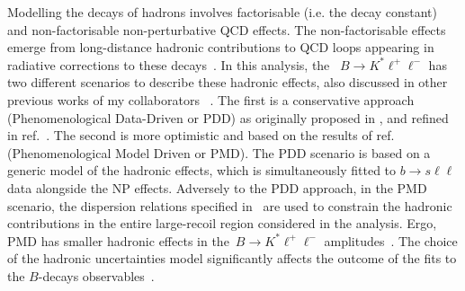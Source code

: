 \par Modelling the decays of hadrons involves factorisable (i.e. the decay constant) and non-factorisable non-perturbative QCD effects. The non-factorisable effects emerge from long-distance hadronic contributions to QCD loops appearing in radiative corrections to these decays~\cite{Khodjamirian:2010vf,Jager:2014rwa,Lyon:2014hpa}. In this analysis, the ~$B\to K^*\ell^+\ell^-$ has two different scenarios to describe these hadronic effects, also discussed in other previous works of my collaborators ~\cite{Ciuchini:2016weo,Ciuchini:2017mik,Ciuchini:2017gva,Ciuchini:2018xll,Ciuchini:2018anp, Ciuchini:2019usw}. The first is a conservative approach (Phenomenological Data-Driven or PDD) as originally proposed in \cite{Ciuchini:2015qxb}, and refined in ref.~\cite{Ciuchini:2018anp}. The second is  more optimistic and  based on the results of ref.~\cite{Khodjamirian:2010vf} (Phenomenological Model Driven or PMD). The PDD scenario is based on a generic model of the hadronic effects, which is simultaneously fitted to $b \to s \ell \ell$ data alongside the NP effects. Adversely to the PDD approach, in the PMD scenario, the dispersion relations specified in~\cite{Khodjamirian:2010vf} are used to constrain the hadronic contributions in the entire large-recoil region considered in the analysis. Ergo, PMD has smaller hadronic effects in the~$B\to K^*\ell^+\ell^-$ amplitudes~\cite{Ciuchini:2016weo}. The choice of the hadronic uncertainties model significantly affects the outcome of the fits to the $B$-decays observables~\cite{Ciuchini:2019usw}. 

